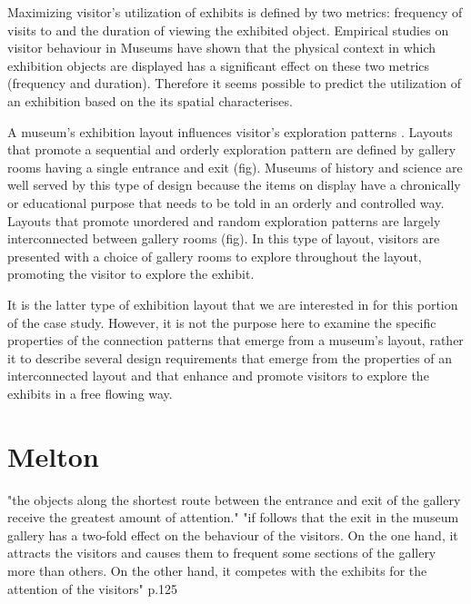 \documentclass[12pt]{ucthesis}
\begin{document}
Maximizing visitor's utilization of exhibits is defined by two metrics: frequency of visits to and the duration of viewing the exhibited object. Empirical studies \cite{Falk} \cite{Melton} \cite{Bitgood} \cite{Porter}  on  visitor behaviour in Museums have shown that the physical context in which exhibition objects are displayed has a significant effect on these two metrics (frequency and duration). Therefore it seems possible to predict the utilization of an exhibition based on the its spatial characterises. 


A museum's exhibition layout influences visitor's exploration patterns \cite{TBD}. Layouts that promote a sequential and orderly exploration pattern are defined by gallery rooms having a single entrance and exit (fig). Museums of history and science are well served by this type of design because the items on display have a chronically or educational purpose that needs to be told in an orderly and controlled way. Layouts that promote unordered and random exploration patterns are largely interconnected between gallery rooms  (fig). In this type of layout, visitors are presented with a choice of gallery rooms to explore throughout the layout, promoting the visitor to explore the exhibit. 

It is the latter type of exhibition layout that we are interested in for this portion of the case study. However, it is not the purpose here to examine the specific properties of the connection patterns that emerge from a museum's layout, rather it to describe several design requirements that emerge from the properties of an interconnected layout and that enhance and promote visitors to explore the exhibits in a free flowing way.

\section{Melton}
"the objects along the shortest route between the entrance and exit of the gallery receive the greatest amount of attention."
"if follows that the exit in the museum gallery has a two-fold effect on the behaviour of the visitors. On the one hand, it attracts the visitors and causes them to frequent some sections of the gallery more than others. On the other hand, it competes with the exhibits for the attention of the visitors" p.125
\end{document}
